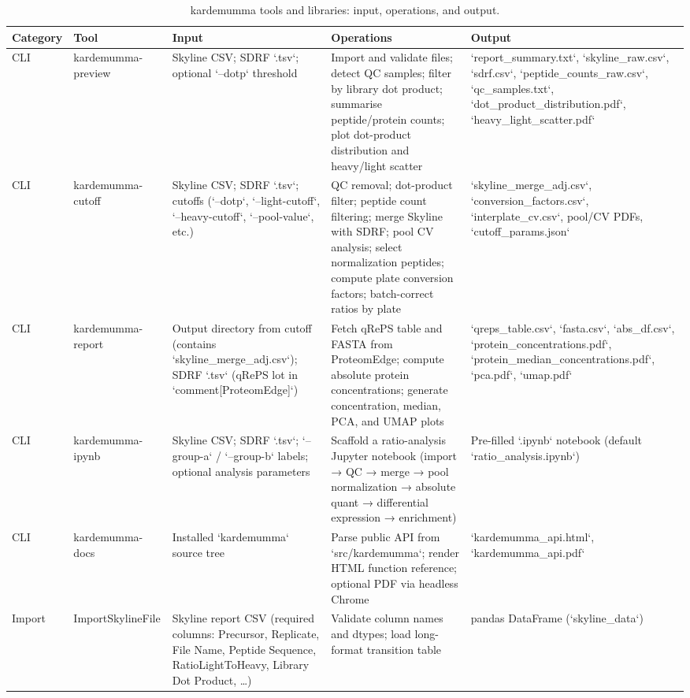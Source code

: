 \begin{table}
\caption{kardemumma tools and libraries: input, operations, and output.}
\label{tab:kardemumma-tools}
\begin{tabular}{llp{3.5cm}p{4.5cm}p{3.5cm}}
\toprule
Category & Tool & Input & Operations & Output \\
\midrule
CLI & kardemumma-preview & Skyline CSV; SDRF `.tsv`; optional `--dotp` threshold & Import and validate files; detect QC samples; filter by library dot product; summarise peptide/protein counts; plot dot-product distribution and heavy/light scatter & `report\_summary.txt`, `skyline\_raw.csv`, `sdrf.csv`, `peptide\_counts\_raw.csv`, `qc\_samples.txt`, `dot\_product\_distribution.pdf`, `heavy\_light\_scatter.pdf` \\
CLI & kardemumma-cutoff & Skyline CSV; SDRF `.tsv`; cutoffs (`--dotp`, `--light-cutoff`, `--heavy-cutoff`, `--pool-value`, etc.) & QC removal; dot-product filter; peptide count filtering; merge Skyline with SDRF; pool CV analysis; select normalization peptides; compute plate conversion factors; batch-correct ratios by plate & `skyline\_merge\_adj.csv`, `conversion\_factors.csv`, `interplate\_cv.csv`, pool/CV PDFs, `cutoff\_params.json` \\
CLI & kardemumma-report & Output directory from cutoff (contains `skyline\_merge\_adj.csv`); SDRF `.tsv` (qRePS lot in `comment[ProteomEdge]`) & Fetch qRePS table and FASTA from ProteomEdge; compute absolute protein concentrations; generate concentration, median, PCA, and UMAP plots & `qreps\_table.csv`, `fasta.csv`, `abs\_df.csv`, `protein\_concentrations.pdf`, `protein\_median\_concentrations.pdf`, `pca.pdf`, `umap.pdf` \\
CLI & kardemumma-ipynb & Skyline CSV; SDRF `.tsv`; `--group-a` / `--group-b` labels; optional analysis parameters & Scaffold a ratio-analysis Jupyter notebook (import → QC → merge → pool normalization → absolute quant → differential expression → enrichment) & Pre-filled `.ipynb` notebook (default `ratio\_analysis.ipynb`) \\
CLI & kardemumma-docs & Installed `kardemumma` source tree & Parse public API from `src/kardemumma`; render HTML function reference; optional PDF via headless Chrome & `kardemumma\_api.html`, `kardemumma\_api.pdf` \\
Import & ImportSkylineFile & Skyline report CSV (required columns: Precursor, Replicate, File Name, Peptide Sequence, RatioLightToHeavy, Library Dot Product, …) & Validate column names and dtypes; load long-format transition table & pandas DataFrame (`skyline\_data`) \\

\end{tabular}
\end{table}
